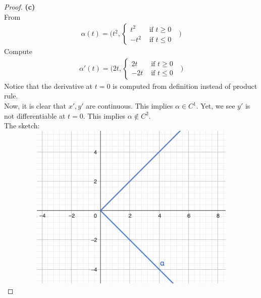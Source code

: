 \documentclass{report}
\begin{document}
\begin{proof}
\textbf{(c)}\\

From 
\begin{align*}
\alpha (t)=\Big(t^2,\begin{cases}
  t^2& \text{ if $t\geq 0$ }\\
  -t^2& \text{ if $t\leq 0$ }
\end{cases} \Big)
\end{align*}
Compute 
\begin{align*}
\alpha '(t)=\Big(2t,\begin{cases}
  2t& \text{ if $t\geq 0$ }\\
  -2t& \text{ if $t\leq 0$ }
\end{cases} \Big)
\end{align*}
Notice that the derivative at $t=0$ is computed from definition instead of product rule.\\


Now, it is clear that $x',y'$ are continuous. This implies $\alpha  \in C^1$. Yet, we see $y'$ is not differentiable at  $t=0$. This implies  $\alpha \not \in C^2$.\\

The sketch:\includegraphics[height=8cm,width=15cm]{qsp}
\end{proof}
\end{document}
